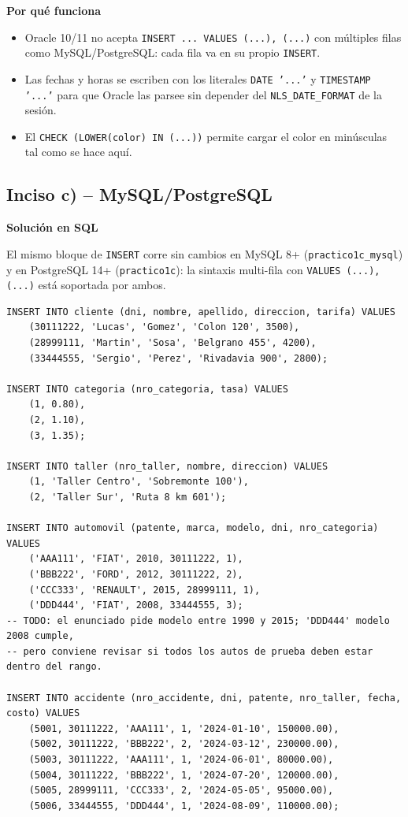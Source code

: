 \documentclass[11pt,a4paper]{article}
\newcommand{\itemcabecera}[1]{\noindent\textbf{#1}\par\medskip}
\newcommand{\bloqueSolucion}{\itemcabecera{Soluci\'on en SQL}}
\newcommand{\bloquePorque}{\itemcabecera{Por qu\'e funciona}}
\begin{document}
\bloquePorque

\begin{itemize}
    \item Oracle 10/11 no acepta \texttt{INSERT ... VALUES (...), (...)} con múltiples filas como MySQL/PostgreSQL: cada fila va en su propio \texttt{INSERT}.
    \item Las fechas y horas se escriben con los literales \texttt{DATE '...'} y \texttt{TIMESTAMP '...'} para que Oracle las parsee sin depender del \texttt{NLS\_DATE\_FORMAT} de la sesión.
    \item El \texttt{CHECK (LOWER(color) IN (...))} permite cargar el color en minúsculas tal como se hace aquí.
\end{itemize}

\subsection{Inciso c) -- MySQL/PostgreSQL}

\bloqueSolucion

El mismo bloque de \texttt{INSERT} corre sin cambios en MySQL 8+ (\texttt{practico1c\_mysql}) y en PostgreSQL 14+ (\texttt{practico1c}): la sintaxis multi-fila con \texttt{VALUES (...), (...)} está soportada por ambos.

\begin{lstlisting}
INSERT INTO cliente (dni, nombre, apellido, direccion, tarifa) VALUES
    (30111222, 'Lucas', 'Gomez', 'Colon 120', 3500),
    (28999111, 'Martin', 'Sosa', 'Belgrano 455', 4200),
    (33444555, 'Sergio', 'Perez', 'Rivadavia 900', 2800);

INSERT INTO categoria (nro_categoria, tasa) VALUES
    (1, 0.80),
    (2, 1.10),
    (3, 1.35);

INSERT INTO taller (nro_taller, nombre, direccion) VALUES
    (1, 'Taller Centro', 'Sobremonte 100'),
    (2, 'Taller Sur', 'Ruta 8 km 601');

INSERT INTO automovil (patente, marca, modelo, dni, nro_categoria) VALUES
    ('AAA111', 'FIAT', 2010, 30111222, 1),
    ('BBB222', 'FORD', 2012, 30111222, 2),
    ('CCC333', 'RENAULT', 2015, 28999111, 1),
    ('DDD444', 'FIAT', 2008, 33444555, 3);
-- TODO: el enunciado pide modelo entre 1990 y 2015; 'DDD444' modelo 2008 cumple,
-- pero conviene revisar si todos los autos de prueba deben estar dentro del rango.

INSERT INTO accidente (nro_accidente, dni, patente, nro_taller, fecha, costo) VALUES
    (5001, 30111222, 'AAA111', 1, '2024-01-10', 150000.00),
    (5002, 30111222, 'BBB222', 2, '2024-03-12', 230000.00),
    (5003, 30111222, 'AAA111', 1, '2024-06-01', 80000.00),
    (5004, 30111222, 'BBB222', 1, '2024-07-20', 120000.00),
    (5005, 28999111, 'CCC333', 2, '2024-05-05', 95000.00),
    (5006, 33444555, 'DDD444', 1, '2024-08-09', 110000.00);
\end{lstlisting}
\end{document}
